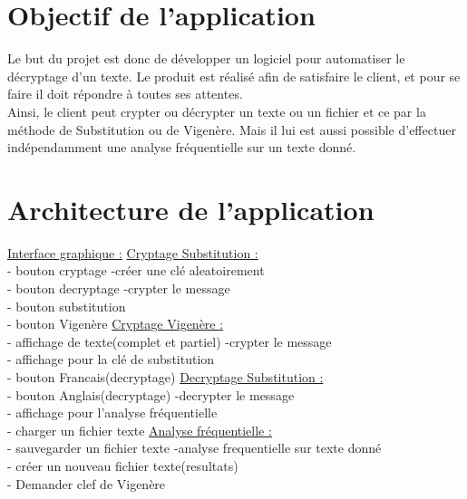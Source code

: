 \documentclass[a4]{article}
\begin{document}
	\section{Objectif de l'application}
	
	
	Le but du projet est donc de développer un logiciel pour automatiser le décryptage d'un texte.
  Le produit est réalisé afin de satisfaire le client, et pour se faire il doit répondre à toutes ses attentes.\\
  Ainsi, le client peut crypter ou décrypter un texte ou un fichier et ce par la méthode de Substitution ou de 
  Vigenère.
  Mais il lui est aussi possible d'effectuer indépendamment une analyse fréquentielle sur un texte donné.
	
	

	\section{Architecture de l'application}
			\underline{Interface graphique :}     \hspace{5cm}  \underline{Cryptage Substitution :}\\
			- bouton cryptage            \hspace{5.5cm}       -créer une clé aleatoirement\\
			- bouton decryptage         \hspace{5cm}        -crypter le message\\
			- bouton substitution\\
			- bouton Vigenère           \hspace{5.2cm}       \underline{Cryptage Vigenère :}\\
			- affichage de texte(complet et partiel)  \hspace{2.2cm} -crypter le message\\
			- affichage pour la clé de substitution\\
			- bouton Francais(decryptage)   \hspace{3.5cm}     \underline{Decryptage Substitution :}\\
			- bouton Anglais(decryptage)    \hspace{3.5cm}     -decrypter le message\\
			- affichage pour l'analyse fréquentielle\\
			- charger un fichier texte       \hspace{4.2cm}  \underline{Analyse fréquentielle :}\\
			- sauvegarder un fichier texte     \hspace{3.8cm}  -analyse frequentielle sur texte donné\\
			- créer un nouveau fichier texte(resultats)\\
			- Demander clef de Vigenère\\
			
\end{document}
